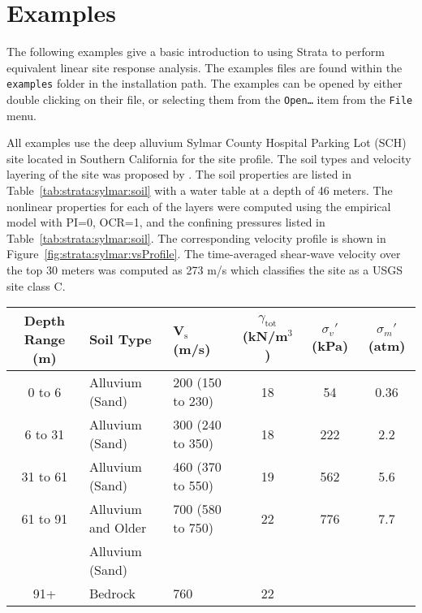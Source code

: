 \documentclass[12pt,oneside]{book}
\begin{document}
\section{Examples}
The following examples give a basic introduction to using Strata to perform equivalent linear site
response analysis.  The examples files are found within the \texttt{examples} folder in the
installation path.  The examples can be opened by either double clicking on their file, or selecting
them from the \texttt{Open\dots} item from the \texttt{File} menu.

All examples use the deep alluvium Sylmar County Hospital Parking Lot (SCH) site located in Southern
California for the site profile.  The soil types and velocity layering of the site was proposed by
\citet{chang:96}.  The soil properties are listed in Table~\ref{tab:strata:sylmar:soil} with a water
table at a depth of 46 meters. The nonlinear properties for each of the layers were computed using
the \citet{darendeli:01} empirical model with PI=0, OCR=1, and the confining pressures listed in
Table~\ref{tab:strata:sylmar:soil}.  The corresponding velocity profile is shown in
Figure~\ref{fig:strata:sylmar:vsProfile}. The time-averaged shear-wave velocity over the top 30
meters was computed as 273 m/s which classifies the site as a USGS site class C.

\begin{sidewaystable}
    \centering
    \begin{tabular}{cllccc}
        \hline\hline
        \textbf{Depth Range} (m) & \textbf{Soil Type} & \textbf{V$_\text{s}$} (m/s) &
        \textbf{$\gamma_\text{tot}$} (kN/m$^3$) & \textbf{$\sigma_v'$} (kPa) & \textbf{$\sigma_{m}'$} (atm) \\
        \hline
        0 to 6 & Alluvium (Sand) & 200 (150 to 230) & 18 & 54 & 0.36\\
        6 to 31 & Alluvium (Sand) & 300 (240 to 350) & 18 & 222 & 2.2 \\
        31 to 61 & Alluvium (Sand) & 460 (370 to 550) & 19 & 562 & 5.6 \\
        61 to 91 & Alluvium and Older & 700 (580 to 750) & 22 & 776 & 7.7 \\
                 & Alluvium (Sand) \\
        91+ & Bedrock & 760 & 22 \\
        \hline\hline
    \end{tabular}
    \caption{Soil profile at the Sylmar County Hospital Parking Lot site~\citep{chang:96}. The mean
        effective stress ($\sigma_{m}'$) is computed assuming a $k_0$ of 1/2 and a water table depth of 46
    meters.}
    \label{tab:strata:sylmar:soil}
\end{sidewaystable}
\end{document}
